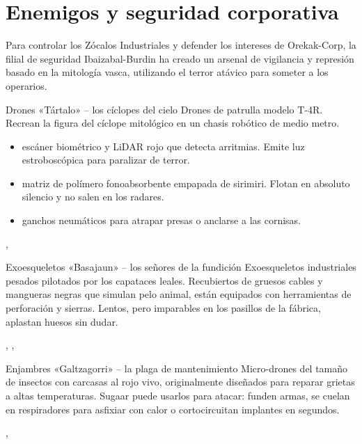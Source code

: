 \chapter{Enemigos y seguridad corporativa}

Para controlar los Zócalos Industriales y defender los intereses de Orekak-Corp, la filial de seguridad Ibaizabal-Burdin ha creado un arsenal de vigilancia y represión basado en la mitología vasca, utilizando el terror atávico para someter a los operarios.


\begin{FichaEnemigo}{Drones «Tártalo» -- los cíclopes del cielo}
Drones de patrulla modelo T-4R. Recrean la figura del cíclope mitológico en un chasis robótico de medio metro.
\begin{itemize}
  \item {} escáner biométrico y LiDAR rojo que detecta arritmias. Emite luz estroboscópica para paralizar de terror.
  \item {} matriz de polímero fonoabsorbente empapada de sirimiri. Flotan en absoluto silencio y no salen en los radares.
  \item {} ganchos neumáticos para atrapar presas o anclarse a las cornisas.
\end{itemize}
 , 
\end{FichaEnemigo}

\begin{FichaEnemigo}{Exoesqueletos «Basajaun» -- los señores de la fundición}
Exoesqueletos industriales pesados pilotados por los capataces leales. Recubiertos de gruesos cables y mangueras negras que simulan pelo animal, están equipados con herramientas de perforación y sierras. Lentos, pero imparables en los pasillos de la fábrica, aplastan huesos sin dudar.\par
{} , , 
\end{FichaEnemigo}


\begin{FichaEnemigo}{Enjambres «Galtzagorri» -- la plaga de mantenimiento}
Micro-drones del tamaño de insectos con carcasas al rojo vivo, originalmente diseñados para reparar grietas a altas temperaturas. Sugaar puede usarlos para atacar: funden armas, se cuelan en respiradores para asfixiar con calor o cortocircuitan implantes en segundos.\par
{} , 
\end{FichaEnemigo}

